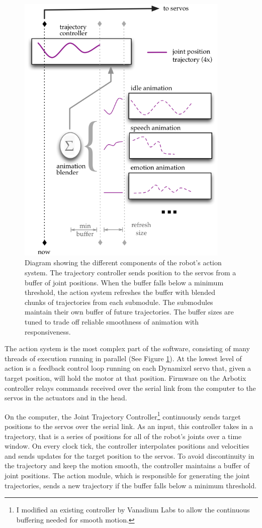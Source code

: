    \begin{figure}[thpb]
      \centering
      \includegraphics[width=4in]{figures/design/animation_system.png}
      \caption{Diagram showing the different components of the robot's action system. The trajectory controller sends position to the servos from a buffer of joint positions. When the buffer falls below a minimum threshold, the action system refreshes the buffer with blended chunks of trajectories from each submodule. The submodules maintain their own buffer of future trajectories. The buffer sizes are tuned to trade off reliable smoothness of animation with responsiveness.}
      \label{fig_animation_system}
   \end{figure}


The action system is the most complex part of the software, consisting of many threads of execution running in parallel (See Figure \ref{fig_animation_system}). At the lowest level of action is a feedback control loop running on each Dynamixel servo that, given a target position, will hold the motor at that position. Firmware on the Arbotix controller relays commands received over the serial link from the computer to the servos in the actuators and in the head.

On the computer, the Joint Trajectory Controller\footnote{I modified an existing controller by Vanadium Labs to allow the continuous buffering needed for smooth motion.} continuously sends target positions to the servos over the serial link. As an input, this controller takes in a trajectory, that is a series of positions for all of the robot's joints over a time window. On every clock tick, the controller interpolates positions and velocities and sends updates for the target position to the servos. To avoid discontinuity in the trajectory and keep the motion smooth, the controller maintains a buffer of joint positions. The action module, which is responsible for generating the joint trajectories, sends a new trajectory if the buffer falls below a minimum threshold. 

